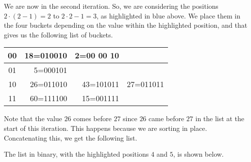 \documentclass[a4paper, openany]{memoir}
\begin{document}
\begin{figure}[H]
    \centering
\end{figure}
\noindent We are now in the second iteration. So, we are considering the positions $2 \cdot (2 - 1) = 2$ to $2 \cdot 2 - 1 = 3$, as highlighted in blue above. We place them in the four buckets depending on the value within the highlighted position, and that gives us the following list of buckets.
\begin{table}[H]
    \centering
    \begin{tabular}{c|rrr}
        00 & 18=01{\color{red}00}10 & 2=00 {\color{red}00} 10  \\
        \hline
        01 & 5=00{\color{red}01}01 \\
        \hline
        10 & 26=01{\color{red}10}10 & 43=10{\color{red}10}11 & 27=01{\color{red}10}11 \\
        \hline
        11 & 60=11{\color{red}11}00 & 15=00{\color{red}11}11
    \end{tabular}
\end{table}
\noindent Note that the value $26$ comes before $27$ since $26$ came before $27$ in the list at the start of this iteration. This happens because we are sorting in place. Concatenating this, we get the following list.
\begin{figure}[H]
    \centering
\end{figure}
\noindent The list in binary, with the highlighted positions $4$ and $5$, is shown below.
\begin{figure}[H]
    \centering
\end{figure}
\end{document}
